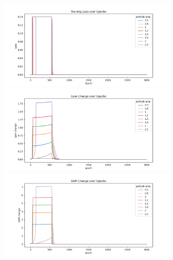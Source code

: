 \documentclass[12pt, a4paper]{article}
\begin{document}
\begin{figure}[H]
    \centering
    \includegraphics[width=0.8\textwidth]{FNN/fig/0221_abb05_perturbamp_loss.png} \\
    \includegraphics[width=0.8\textwidth]{FNN/fig/0221_abb05_perturbamp_gc.png} \\
    \includegraphics[width=0.8\textwidth]{FNN/fig/0221_abb05_perturbamp_sc.png} \\
\end{figure}
\end{document}
